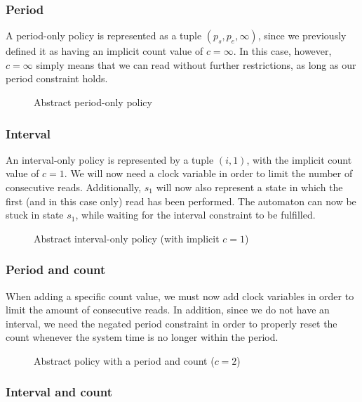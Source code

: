 \subsubsection{Period}
A period-only policy is represented as a tuple $(p_s, p_e, \infty)$, since we previously defined it as having an implicit count value of $c = \infty$.
In this case, however, $c = \infty$ simply means that we can read without further restrictions, as long as our period constraint holds.

\begin{figure}[H]
  \centering
  
  \caption{Abstract period-only policy}
\end{figure}

\subsubsection{Interval}
An interval-only policy is represented by a tuple $(i, 1)$, with the implicit count value of $c = 1$.
We will now need a clock variable in order to limit the number of consecutive reads.
Additionally, $s_1$ will now also represent a state in which the first (and in this case only) read has been performed.
The automaton can now be stuck in state $s_1$, while waiting for the interval constraint to be fulfilled.

\begin{figure}[H]
  \centering
  
  \caption{Abstract interval-only policy (with implicit $c = 1$)}
\end{figure}

\subsubsection{Period and count}
When adding a specific count value, we must now add clock variables in order to limit the amount of consecutive reads.
In addition, since we do not have an interval, we need the negated period constraint in order to properly reset the count whenever the system time is no longer within the period.

\begin{figure}[H]
  \centering
  
  \caption{Abstract policy with a period and count ($c = 2$)}
\end{figure}

\subsubsection{Interval and count}


